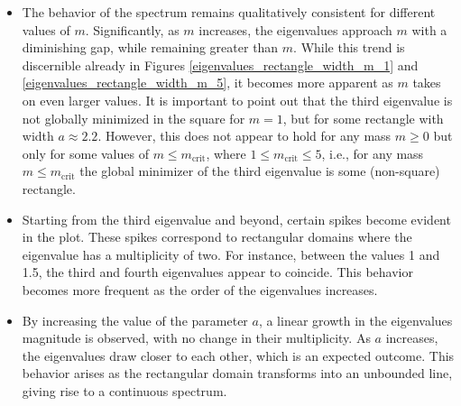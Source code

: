 \begin{itemize}
  \item The behavior of the spectrum remains qualitatively consistent for different values of \(m\). Significantly, as \(m\) increases, the eigenvalues approach \(m\) with a diminishing gap, while remaining greater than \(m\). While this trend is discernible already in Figures \ref{eigenvalues_rectangle_width_m_1} and \ref{eigenvalues_rectangle_width_m_5}, it becomes more apparent as \(m\) takes on even larger values. It is important to point out that the third eigenvalue is not globally minimized in the square for \(m=1\), but for some rectangle with width \(a \approx 2.2\). However, this does not appear to hold for any mass \(m \geq 0\) but only for some values of \(m \leq m_{\text{crit}}\), where \(1 \leq m_{\text{crit}} \leq 5\), i.e., for any mass \(m \leq m_{\text{crit}}\) the global minimizer of the third eigenvalue is some (non-square) rectangle.
  
  \item Starting from the third eigenvalue and beyond, certain spikes become evident in the plot. These spikes correspond to rectangular domains where the eigenvalue has a multiplicity of two. For instance, between the values 1 and 1.5, the third and fourth eigenvalues appear to coincide. This behavior becomes more frequent as the order of the eigenvalues increases.
  
  \item By increasing the value of the parameter \(a\), a linear growth in the eigenvalues magnitude is observed, with no change in their multiplicity. As \(a\) increases, the eigenvalues draw closer to each other, which is an expected outcome. This behavior arises as the rectangular domain transforms into an unbounded line, giving rise to a continuous spectrum.
\end{itemize}

